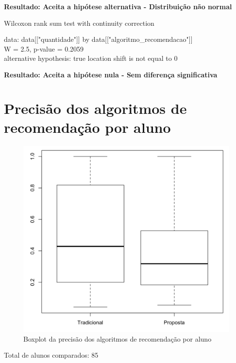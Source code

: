 \noindent
\textbf{Resultado: Aceita a hipótese alternativa - Distribuição não normal}

Wilcoxon rank sum test with continuity correction

\noindent
data:  data[["quantidade"]] by data[["algoritmo\_recomendacao"]]\\
W = 2.5, p-value = 0.2059\\
alternative hypothesis: true location shift is not equal to 0

\noindent
\textbf{Resultado: Aceita a hipótese nula - Sem diferença significativa}

\newpage
\section{Precisão dos algoritmos de recomendação por aluno}

\begin{figure}[htb]
  \caption{\label{fig:precisao-boxplot}Boxplot da precisão dos algoritmos de recomendação por aluno}
  \begin{center}
      \includegraphics[scale=0.4]{./Figuras/precisao-boxplot.png}
  \end{center}
\end{figure}

\noindent
Total de alunos comparados: 85

